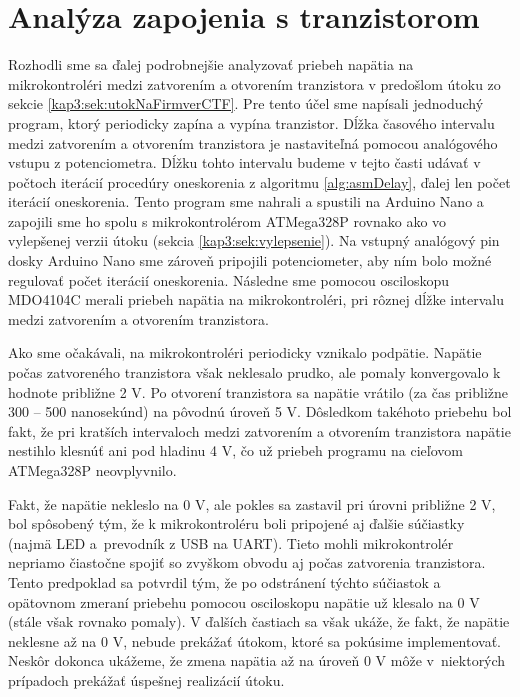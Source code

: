 \section{Analýza zapojenia s tranzistorom} \label{kap3:sek:analyZaTranzistoru}
Rozhodli sme sa ďalej podrobnejšie analyzovať priebeh napätia na mikrokontroléri medzi zatvorením a otvorením tranzistora v predošlom útoku zo sekcie \ref{kap3:sek:utokNaFirmverCTF}. Pre tento účel sme napísali jednoduchý program, ktorý periodicky zapína a vypína tranzistor. Dĺžka časového intervalu medzi zatvorením a otvorením tranzistora je nastaviteľná pomocou analógového vstupu z potenciometra. Dĺžku tohto intervalu budeme v tejto časti udávať v počtoch iterácií procedúry oneskorenia z algoritmu \ref{alg:asmDelay}, ďalej len počet iterácií oneskorenia. Tento program sme nahrali a spustili na Arduino Nano a zapojili sme ho spolu s mikrokontrolérom ATMega328P rovnako ako vo vylepšenej verzii útoku (sekcia \ref{kap3:sek:vylepsenie}). Na vstupný analógový pin dosky Arduino Nano sme zároveň pripojili potenciometer, aby ním bolo možné regulovať počet iterácií oneskorenia. Následne sme pomocou osciloskopu MDO4104C merali priebeh napätia na mikrokontroléri, pri rôznej dĺžke intervalu medzi zatvorením a otvorením tranzistora.

Ako sme očakávali, na mikrokontroléri periodicky vznikalo podpätie. Napätie počas zatvoreného tranzistora však neklesalo prudko, ale pomaly konvergovalo k hodnote približne 2 V. Po otvorení tranzistora sa napätie vrátilo (za čas približne 300 -- 500 nanosekúnd) na pôvodnú úroveň 5 V. Dôsledkom takéhoto priebehu bol fakt, že pri kratších intervaloch medzi zatvorením a otvorením tranzistora napätie nestihlo klesnúť ani pod hladinu 4 V, čo už priebeh programu na cieľovom ATMega328P neovplyvnilo.

Fakt, že napätie nekleslo na 0 V, ale pokles sa zastavil pri úrovni približne 2 V, bol spôsobený tým, že k mikrokontroléru boli pripojené aj ďalšie súčiastky (najmä LED a~prevodník z USB na UART). Tieto mohli mikrokontrolér nepriamo čiastočne spojiť so zvyškom obvodu aj počas zatvorenia tranzistora. Tento predpoklad sa potvrdil tým, že po odstránení týchto súčiastok a opätovnom zmeraní priebehu pomocou osciloskopu napätie už klesalo na 0 V (stále však rovnako pomaly). V ďalších častiach sa však ukáže, že fakt, že napätie neklesne až na 0 V, nebude prekážať útokom, ktoré sa pokúsime implementovať. Neskôr dokonca ukážeme, že zmena napätia až na úroveň 0 V môže v~niektorých prípadoch prekážať úspešnej realizácií útoku.

